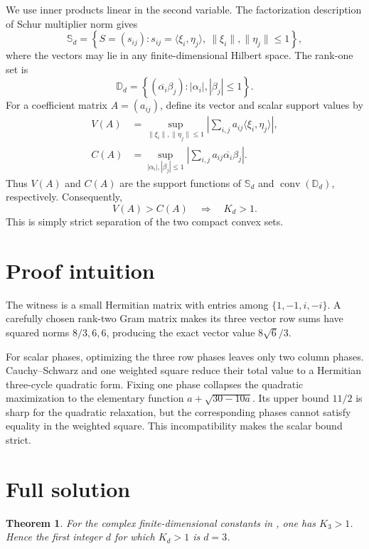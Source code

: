 \documentclass[11pt]{article}
\newtheorem{theorem}{Theorem}
\newcommand{\Sball}{\mathbb S}
\newcommand{\Dball}{\mathbb D}
\newcommand{\conv}{\operatorname{conv}}
\begin{document}
We use inner products linear in the second variable.  The factorization
description of Schur multiplier norm gives
\[
 \Sball_d=\left\{S=(s_{ij}):s_{ij}=\langle \xi_i,\eta_j\rangle,
 \ \|\xi_i\|,\|\eta_j\|\leq1\right\},
\]
where the vectors may lie in any finite-dimensional Hilbert space.  The
rank-one set is
\[
 \Dball_d=\left\{(\overline{\alpha_i}\beta_j):
 |\alpha_i|,|\beta_j|\leq1\right\}.
\]
For a coefficient matrix $A=(a_{ij})$, define its vector and scalar support
values by
\begin{align*}
 V(A)&=\sup_{\|\xi_i\|,\|\eta_j\|\leq1}
 \left|\sum_{i,j}a_{ij}\langle\xi_i,\eta_j\rangle\right|,\\
 C(A)&=\sup_{|\alpha_i|,|\beta_j|\leq1}
 \left|\sum_{i,j}a_{ij}\overline{\alpha_i}\beta_j\right|.
\end{align*}
Thus $V(A)$ and $C(A)$ are the support functions of $\Sball_d$ and
$\conv(\Dball_d)$, respectively.  Consequently,
\begin{equation}\label{eq:separation}
 V(A)>C(A)\quad\Longrightarrow\quad K_d>1.
\end{equation}
This is simply strict separation of the two compact convex sets.

\section{Proof intuition}

The witness is a small Hermitian matrix with entries among
$\{1,-1,i,-i\}$.  A carefully chosen rank-two Gram matrix makes its three
vector row sums have squared norms $8/3,6,6$, producing the exact vector
value $8\sqrt6/3$.

For scalar phases, optimizing the three row phases leaves only two column
phases.  Cauchy--Schwarz and one weighted square reduce their total value to
a Hermitian three-cycle quadratic form.  Fixing one phase collapses the
quadratic maximization to the elementary function
$a+\sqrt{30-10a}$.  Its upper bound $11/2$ is sharp for the quadratic
relaxation, but the corresponding phases cannot satisfy equality in the
weighted square.  This incompatibility makes the scalar bound strict.

\section{Full solution}

\begin{theorem}\label{thm:main}
For the complex finite-dimensional constants in \cite{YDX}, one has
$K_3>1$.  Hence the first integer $d$ for which $K_d>1$ is $d=3$.
\end{theorem}
\end{document}
